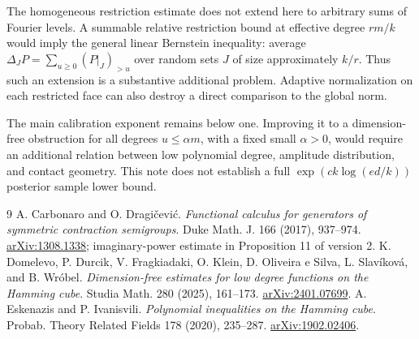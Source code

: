 \documentclass[11pt]{article}
\theoremstyle{remark}\newtheorem{remark}[theorem]{Remark}
\newcommand{\1}{\mathbf 1}\newcommand{\norm}[2]{\lVert #1\rVert_{#2}}
\begin{document}
The homogeneous restriction estimate does not extend here to arbitrary sums of Fourier levels. A summable relative restriction bound at effective degree $rm/k$ would imply the general linear Bernstein inequality: average $\Delta_JP=\sum_{u\ge0}(P|_J)_{>u}$ over random sets $J$ of size approximately $k/r$. Thus such an extension is a substantive additional problem. Adaptive normalization on each restricted face can also destroy a direct comparison to the global norm.

The main calibration exponent remains below one. Improving it to a dimension-free obstruction for all degrees $u\le\alpha m$, with a fixed small $\alpha>0$, would require an additional relation between low polynomial degree, amplitude distribution, and contact geometry. This note does not establish a full $\exp(c k\log(ed/k))$ posterior sample lower bound.

\begin{thebibliography}{9}
 A. Carbonaro and O. Dragi\v cevi\'c.
\emph{Functional calculus for generators of symmetric contraction semigroups}.
Duke Math. J. 166 (2017), 937--974.
\href{https://arxiv.org/abs/1308.1338}{arXiv:1308.1338}; imaginary-power estimate in Proposition 11 of version 2.
 K. Domelevo, P. Durcik, V. Fragkiadaki, O. Klein, D. Oliveira e Silva, L. Slav\'ikov\'a, and B. Wr\'obel.
\emph{Dimension-free estimates for low degree functions on the Hamming cube}.
Studia Math. 280 (2025), 161--173.
\href{https://arxiv.org/abs/2401.07699}{arXiv:2401.07699}.
 A. Eskenazis and P. Ivanisvili.
\emph{Polynomial inequalities on the Hamming cube}.
Probab. Theory Related Fields 178 (2020), 235--287.
\href{https://arxiv.org/abs/1902.02406}{arXiv:1902.02406}.
\end{thebibliography}
\end{document}
